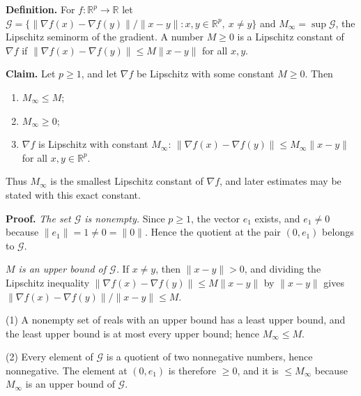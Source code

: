 \documentclass[11pt,a4paper]{article}
\begin{document}
\textbf{Definition.} For \(f:\mathbb R^p\to\mathbb R\) let \(\mathcal G=\bigl\{\|\nabla f(x)-\nabla f(y)\|/\|x-y\|:x,y\in\mathbb R^p,\ x\ne y\bigr\}\) and \(M_\infty=\sup\mathcal G\), the Lipschitz seminorm of the gradient. A number \(M\ge0\) is a Lipschitz constant of \(\nabla f\) if \(\|\nabla f(x)-\nabla f(y)\|\le M\|x-y\|\) for all \(x,y\).




\textbf{Claim.} Let \(p\ge1\), and let \(\nabla f\) be Lipschitz with some constant \(M\ge0\). Then



\begin{enumerate}


\item \(M_\infty\le M\);

\item \(M_\infty\ge0\);

\item \(\nabla f\) is Lipschitz with constant \(M_\infty\): \(\|\nabla f(x)-\nabla f(y)\|\le M_\infty\|x-y\|\) for all \(x,y\in\mathbb R^p\).

\end{enumerate}



Thus \(M_\infty\) is the smallest Lipschitz constant of \(\nabla f\), and later estimates may be stated with this exact constant.




\textbf{Proof.} \emph{The set \(\mathcal G\) is nonempty.} Since \(p\ge1\), the vector \(e_1\) exists, and \(e_1\ne0\) because \(\|e_1\|=1\ne0=\|0\|\). Hence the quotient at the pair \((0,e_1)\) belongs to \(\mathcal G\).




\emph{\(M\) is an upper bound of \(\mathcal G\).} If \(x\ne y\), then \(\|x-y\|>0\), and dividing the Lipschitz inequality \(\|\nabla f(x)-\nabla f(y)\|\le M\|x-y\|\) by \(\|x-y\|\) gives \(\|\nabla f(x)-\nabla f(y)\|/\|x-y\|\le M\).




(1) A nonempty set of reals with an upper bound has a least upper bound, and the least upper bound is at most every upper bound; hence \(M_\infty\le M\).




(2) Every element of \(\mathcal G\) is a quotient of two nonnegative numbers, hence nonnegative. The element at \((0,e_1)\) is therefore \(\ge0\), and it is \(\le M_\infty\) because \(M_\infty\) is an upper bound of \(\mathcal G\).
\end{document}
